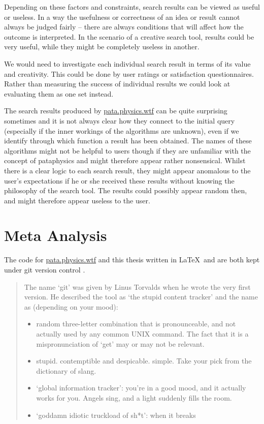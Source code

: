 Depending on these factors and constraints, search results can be viewed as useful or useless. In a way the usefulness or correctness of an idea or result cannot always be judged fairly – there are always conditions that will affect how the outcome is interpreted. In the scenario of a creative search tool, results could be very useful, while they might be completely useless in another.

We would need to investigate each individual search result in terms of its value and creativity. This could be done by user ratings or satisfaction questionnaires. Rather than measuring the success of individual results we could look at evaluating them as one set instead.

The search results produced by \url{pata.physics.wtf} can be quite surprising sometimes and it is not always clear how they connect to the initial query (especially if the inner workings of the algorithms are unknown), even if we identify through which function a result has been obtained. The names of these algorithms might not be helpful to users though if they are unfamiliar with the concept of pataphysics and might therefore appear rather nonsensical. Whilst there is a clear logic to each search result, they might appear anomalous to the user's expectations if he or she received these results without knowing the philosophy of the search tool. The results could possibly appear random then, and might therefore appear useless to the user.


\section{Meta Analysis}

The code for \url{pata.physics.wtf} and this thesis written in \LaTeX \ and are both kept under git version control \autocite{Git2016}.

\begin{quotation}
  The name `git' was given by Linus Torvalds when he wrote the very first version. He described the tool as `the stupid content tracker' and the name as (depending on your mood):
  \begin{itemize}
    \item random three-letter combination that is pronounceable, and not actually used by any common UNIX command. The fact that it is a mispronunciation of `get' may or may not be relevant.
    \item stupid. contemptible and despicable. simple. Take your pick from the dictionary of slang.
    \item `global information tracker': you're in a good mood, and it actually works for you. Angels sing, and a light suddenly fills the room.
    \item `goddamn idiotic truckload of sh*t': when it breaks 
  \end{itemize} 
\end{quotation}

